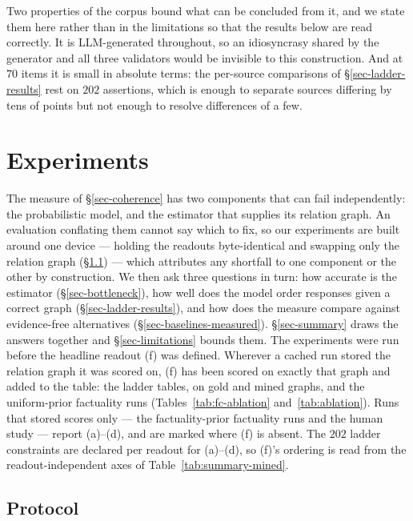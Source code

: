 Two properties of the corpus bound what can be concluded from it, and we state them here rather than in
the limitations so that the results below are read correctly. It is LLM-generated throughout, so an
idiosyncrasy shared by the generator and all three validators would be invisible to this construction.
And at $70$ items it is small in absolute terms: the per-source comparisons of \S\ref{sec-ladder-results}
rest on $202$ assertions, which is enough to separate sources differing by tens of points but not enough to
resolve differences of a few.

\section{Experiments}
\label{sec-experiments}

The measure of \S\ref{sec-coherence} has two components that can fail independently: the probabilistic model, and
the estimator that supplies its relation graph. An evaluation conflating them cannot say which to fix, so our
experiments are built around one device --- holding the readouts byte-identical and swapping only the relation
graph (\S\ref{sec-protocol}) --- which attributes any shortfall to one component or the other by construction. We
then ask three questions in turn: how accurate is the estimator (\S\ref{sec-bottleneck}), how well does the model
order responses given a correct graph (\S\ref{sec-ladder-results}), and how does the measure compare against
evidence-free alternatives (\S\ref{sec-baselines-measured}). \S\ref{sec-summary} draws the answers together and
\S\ref{sec-limitations} bounds them. The experiments were run before the headline readout (f) was defined.
Wherever a cached run stored the relation graph it was scored on, (f) has been scored on exactly that graph and added
to the table: the ladder tables, on gold and mined graphs, and the uniform-prior factuality runs
(Tables~\ref{tab:fc-ablation} and~\ref{tab:ablation}). Runs that stored scores only --- the factuality-prior
factuality runs and the human study --- report (a)--(d), and are marked where (f) is absent. The $202$ ladder
constraints are declared per readout for (a)--(d), so (f)'s ordering is read from the readout-independent axes of
Table~\ref{tab:summary-mined}.

\subsection{Protocol}
\label{sec-protocol}

